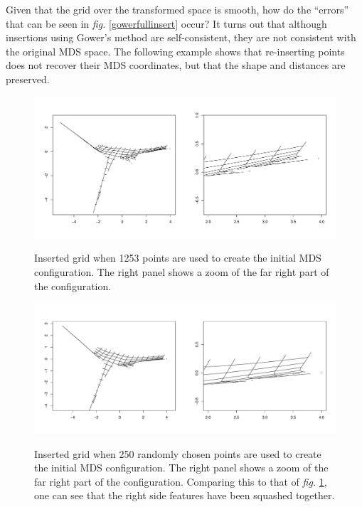 \documentclass[a4paper,10pt]{article}
\newcommand{\fig}[1]{\emph{fig.} \ref{#1}}
\begin{document}
Given that the grid over the transformed space is smooth, how do the ``errors'' that can be seen in \fig{gowerfullinsert} occur? It turns out that although insertions using Gower's method are self-consistent, they are not consistent with the original MDS space. The following example shows that re-inserting points does not recover their MDS coordinates, but that the shape and distances are preserved.

\begin{figure}
\centering
\includegraphics[width=5in]{figs/wt2-grid-full.pdf} \\
\caption{Inserted grid when 1253 points are used to create the initial MDS configuration. The right panel shows a zoom of the far right part of the configuration.}
\label{wt2-grid-full}
\end{figure}

\begin{figure}
\centering
\includegraphics[width=5in]{figs/wt2-grid-samp.pdf} \\
\caption{Inserted grid when 250 randomly chosen points are used to create the initial MDS configuration. The right panel shows a zoom of the far right part of the configuration. Comparing this to that of \fig{wt2-grid-full}, one can see that the right side features have been squashed together.}
\label{wt2-grid-samp}
\end{figure}
\end{document}
